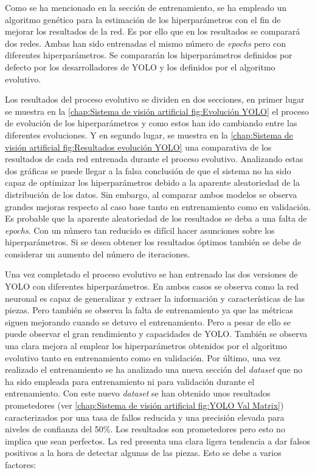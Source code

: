 Como se ha mencionado en la sección de entrenamiento, se ha empleado un algoritmo genético para la estimación de los hiperparámetros con el fin de mejorar los resultados de la red. Es por ello que en los resultados se comparará dos redes. Ambas han sido entrenadas el mismo número de \textit{epochs} pero con diferentes hiperparámetros. Se compararán los hiperparámetros definidos por defecto por los desarrolladores de YOLO y los definidos por el algoritmo evolutivo.

Los resultados del proceso evolutivo se dividen en dos secciones, en primer lugar se muestra en la \autoref{chap:Sistema de visión artificial fig:Evolución YOLO} el proceso de evolución de los hiperparámetros y como estos han ido cambiando entre las diferentes evoluciones. Y en segundo lugar, se muestra en la \autoref{chap:Sistema de visión artificial fig:Resultados evolución YOLO} una comparativa de los resultados de cada red entrenada durante el proceso evolutivo. Analizando estas dos gráficas se puede llegar a la falsa conclusión de que el sistema no ha sido capaz de optimizar los hiperparámetros debido a la aparente aleatoriedad de la distribución de los datos. Sin embargo, al comparar ambos modelos se observa grandes mejoras respecto al caso base tanto en entrenamiento como en validación. Es probable que la aparente aleatoriedad de los resultados se deba a una falta de \textit{epochs}. Con un número tan reducido es difícil hacer asunciones sobre los hiperparámetros. Si se desea obtener los resultados óptimos también se debe de considerar un aumento del número de iteraciones.

Una vez completado el proceso evolutivo se han entrenado las dos versiones de YOLO con diferentes hiperparámetros. En ambos casos se observa como la red neuronal es capaz de generalizar y extraer la información y características de las piezas. Pero también se observa la falta de entrenamiento ya que las métricas siguen mejorando cuando se detuvo el entrenamiento. Pero a pesar de ello se puede observar el gran rendimiento y capacidades de YOLO. También se observa una clara mejora al emplear los hiperparámetros obtenidos por el algoritmo evolutivo tanto en entrenamiento como en validación. Por último, una vez realizado el entrenamiento se ha analizado una nueva sección del \textit{dataset} que no ha sido empleada para entrenamiento ni para validación durante el entrenamiento. Con este nuevo \textit{dataset} se han obtenido unos resultados prometedores (ver \autoref{chap:Sistema de visión artificial fig:YOLO Val Matrix}) caracterizados por una tasa de fallos reducida y una precisión elevada para niveles de confianza del 50\%. Los resultados son prometedores pero esto no implica que sean perfectos. La red presenta una clara ligera tendencia a dar falsos positivos a la hora de detectar algunas de las piezas. Esto se debe a varios factores:

